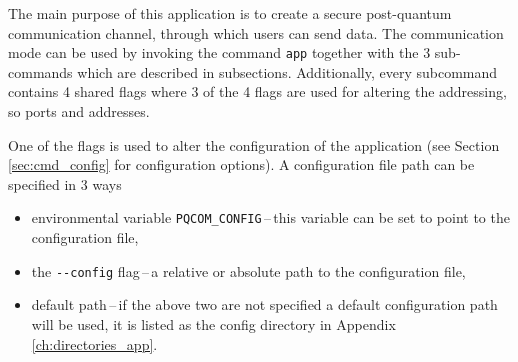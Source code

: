 The main purpose of this application is to create a secure post-quantum communication channel, through which users can send data. The communication mode can be used by invoking the command \texttt{app} together with the 3 sub-commands which are described in subsections. Additionally, every subcommand contains 4 shared flags where 3 of the 4 flags are used for altering the addressing, so ports and addresses.

One of the flags is used to alter the configuration of the application (see Section \ref{sec:cmd_config} for configuration options). A configuration file path can be specified in 3 ways

\begin{itemize}
  \item environmental variable \texttt{PQCOM\_CONFIG}\,--\,this variable can be set to point to the configuration file,
  \item the \texttt{-\--config} flag\,--\,a relative or absolute path to the configuration file,
  \item default path\,--\,if the above two are not specified a default configuration path will be used, it is listed as the config directory in Appendix \ref{ch:directories_app}.
\end{itemize}

